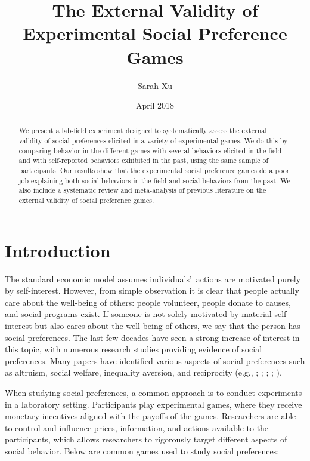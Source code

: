 \documentclass[12pt]{article}
\title{The External Validity of Experimental Social Preference Games}
\author{Sarah Xu}
\date{April 2018}
\begin{document}
\maketitle


\begin{abstract}

   We present a lab-field experiment designed to systematically assess the external validity of social preferences elicited in a variety of experimental games. We do this by comparing behavior in the different games with several behaviors elicited in the field and with self-reported behaviors exhibited in the past, using the same sample of participants. Our results show that the experimental social preference games do a poor job explaining both social behaviors in the field and social behaviors from the past. We also include a systematic review and meta-analysis of previous literature on the external validity of social preference games.

\end{abstract}

\section{Introduction}

The standard economic model assumes individuals\rq \ actions are motivated purely by self-interest. However, from simple observation it is clear that people actually care about the well-being of others: people volunteer, people donate to causes, and social programs exist. If someone is not solely motivated by material self-interest but also cares about the well-being of others, we say that the person has social preferences. The last few decades have seen a strong increase of interest in this topic, with numerous research studies providing evidence of social preferences. Many papers have identified various aspects of social preferences such as altruism, social welfare, inequality aversion, and reciprocity (e.g., \cite{charness_rabin_2002}; \cite{fehr_schmidt_1999}; \cite{andreoni_miller_2002}; \cite{rabin_1993}; \cite{fisman_jakiela_kariv_2014}). 
 
When studying social preferences, a common approach is to conduct experiments in a laboratory setting. Participants play experimental games, where they receive monetary incentives aligned with the payoffs of the games. Researchers are able to control and influence prices, information, and actions available to the participants, which allows researchers to rigorously target different aspects of social behavior. Below are common games used to study social preferences: 
\end{document}

